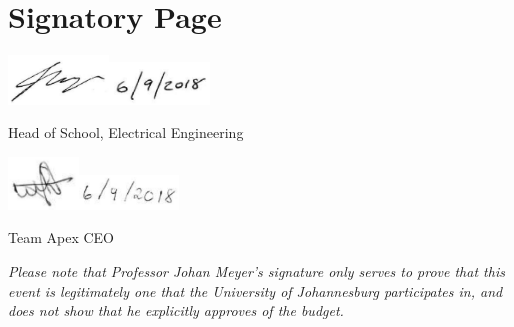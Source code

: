\documentclass[a4paper, 12pt]{article}
\begin{document}
	\hypersetup{pageanchor=true}
	\tableofcontents
	\newpage

	\section*{Signatory Page} %
	\label{sec:signatory_page}
		\vspace*{8em}
		\hspace*{1cm}\includegraphics[width=0.2\textwidth]{img/prof_sig.png}\hspace*{\fill}\includegraphics[width=0.2\textwidth]{img/prof_date.png}\vspace*{1em}\par\noindent
		{Head of School, Electrical Engineering\par}
		\vspace*{8em}
		\hspace*{1cm}\includegraphics[width=0.14\textwidth]{img/wes_sig.png}\hspace*{\fill}\includegraphics[width=0.2\textwidth]{img/wes_date.png}\vspace*{1em}\par\noindent
		\noindent{}
		{Team Apex CEO}\par
		\vspace*{\fill}
		\noindent\textit{Please note that Professor Johan Meyer's signature only serves to prove that this event is legitimately one that the University of Johannesburg participates in, and does not show that he explicitly approves of the budget.}
	\newpage
\end{document}
